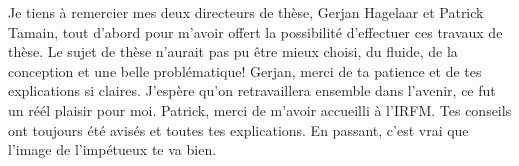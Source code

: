 \thispagestyle{preface}

Je tiens à remercier mes deux directeurs de thèse, Gerjan Hagelaar et Patrick
Tamain, tout d'abord pour m'avoir offert la possibilité d'effectuer ces travaux
de thèse. Le sujet de thèse n'aurait pas pu être mieux choisi, du fluide, de la
conception et une belle problématique! Gerjan, merci de ta patience et de tes
explications si claires. J'espère qu'on retravaillera ensemble dans
l'avenir, ce fut un réél plaisir pour moi. Patrick, merci de m'avoir accueilli à
l'IRFM. Tes conseils ont toujours été avisés et toutes tes explications. En
passant, c'est vrai que l'image de l'impétueux te va bien.


